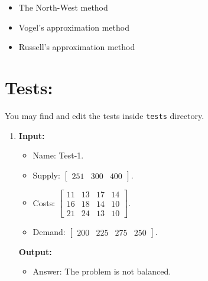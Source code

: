 \documentclass{article}
\begin{document}
\begin{itemize}
\item The North-West method
\item Vogel’s approximation method
\item  Russell’s approximation method
\end{itemize}

\newpage

\section*{Tests:}

You may find and edit the tests inside \texttt{tests} directory.

\begin{enumerate}[label={(\arabic*)}, itemsep=0.25in]
\item \textbf{Input:}
\begin{itemize}
\item Name: Test-1.
\item Supply: \(\begin{bmatrix} 251 & 300 & 400 \end{bmatrix}\).
\item Costs: \(\begin{bmatrix}
11 & 13 & 17 & 14 \\
16 & 18 & 14 & 10 \\
21 & 24 & 13 & 10
\end{bmatrix}\).
\item Demand: \(\begin{bmatrix} 200 & 225 & 275 & 250 \end{bmatrix}\).
\end{itemize}
\textbf{Output:}
\begin{itemize}
\item Answer: The problem is not balanced.
\end{itemize}


\end{enumerate}
\end{document}
